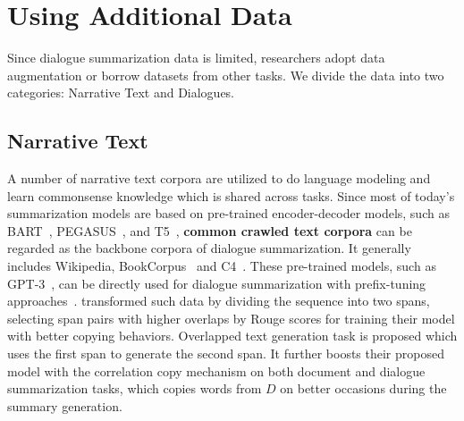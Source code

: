 \section{Using Additional Data}\label{sec:useadddata}

Since dialogue summarization data is limited, researchers 
adopt data augmentation or borrow datasets from other tasks. 
We divide the data into two categories: 
Narrative Text and Dialogues.

\subsection{Narrative Text}

A number of {narrative text corpora} are utilized to do language modeling and learn commonsense knowledge which is shared across tasks.
Since most of today's summarization models are based on pre-trained encoder-decoder models, such as BART~\cite{lewis2020bart}, PEGASUS~\cite{zhang2020pegasus}, and T5~\cite{raffel2020exploring},  \textbf{common crawled text corpora} can be regarded as the backbone corpora of dialogue summarization. It generally includes Wikipedia, BookCorpus~\cite{zhu2015aligning} and 
C4~\cite{raffel2020exploring}. 
These pre-trained models, such as GPT-3~\cite{brown2020language}, can be directly used for dialogue summarization with prefix-tuning approaches~\cite{prodan2021prompt}.
\citet{li2021learn} transformed such data by dividing the sequence 
into two spans, selecting span pairs with higher overlaps by Rouge scores for training their model with better copying behaviors.
Overlapped text generation task is proposed which uses the first span to generate the second span. It further boosts their proposed model with the correlation copy mechanism on both document and dialogue summarization tasks, which copies words from $D$ on better occasions during the summary generation.


